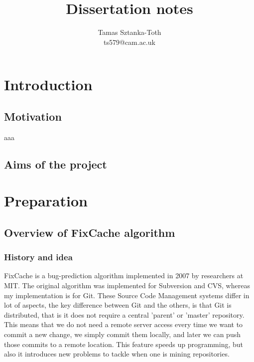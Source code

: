\documentclass[12pt,twoside,notitlepage]{report}
\title{Dissertation notes}
\author{Tamas Sztanka-Toth \\ ts579@cam.ac.uk}
\newcommand{\fxch}{FixCache }
\begin{document}
\setcounter{page}{1}
\pagestyle{plain}

\maketitle{}
\tableofcontents
\cleardoublepage        %

\setcounter{page}{1}
\pagestyle{headings}
\chapter{Introduction}
\section{Motivation}
aaa
\section{Aims of the project}
\cleardoublepage
\chapter{Preparation}
\section{Overview of \fxch algorithm}
\subsection{History and idea}
\fxch is a bug-prediction algorithm implemented in 2007 by researchers at MIT\cite{FixCache}. The original algorithm was implemented for Subversion and CVS, whereas my implementation is for Git. These Source Code Management systems differ in lot of aspects, the key difference between Git and the others, is that Git is distributed, that is it does not require a central 'parent' or 'master' repository. This means that we do not need a remote server access every time we want to commit a new change, we simply commit them locally, and later we can push those commits to a remote location. This feature speeds up programming, but also it introduces new problems to tackle when one is mining repositories\cite{Git}.
\end{document}
